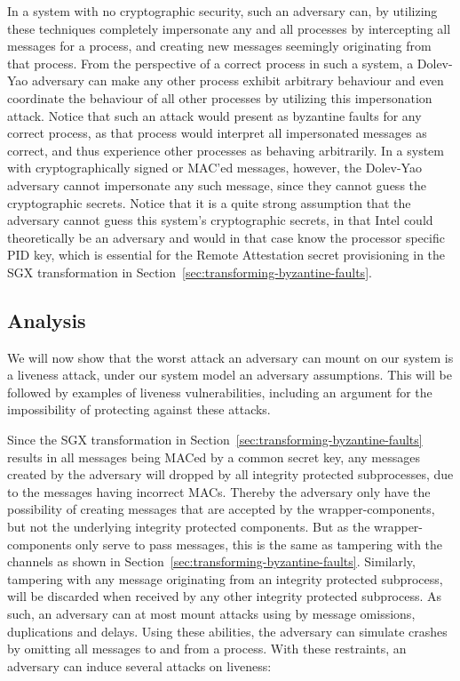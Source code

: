 \documentclass{article}
\begin{document}
		In a system with no cryptographic security, such an adversary can, by utilizing these techniques completely impersonate any and all processes by intercepting all messages for a process, and creating new messages seemingly originating from that process.
		From the perspective of a correct process in such a system, a Dolev-Yao adversary can make any other process exhibit arbitrary behaviour and even coordinate the behaviour of all other processes by utilizing this impersonation attack.
		Notice that such an attack would present as byzantine faults for any correct process, as that process would interpret all impersonated messages as correct, and thus experience other processes as behaving arbitrarily.
		In a system with cryptographically signed or MAC'ed messages, however, the Dolev-Yao adversary cannot impersonate any such message, since they cannot guess the cryptographic secrets.
		Notice that it is a quite strong assumption that the adversary cannot guess this system's cryptographic secrets, in that Intel could theoretically be an adversary and would in that case know the processor specific PID key, which is essential for the Remote Attestation secret provisioning in the SGX transformation in Section~\ref{sec:transforming-byzantine-faults}.

		\subsection{Analysis}

        We will now show that the worst attack an adversary can mount on our system is a liveness attack, under our system model an adversary assumptions.
        This will be followed by examples of liveness vulnerabilities, including an argument for the impossibility of protecting against these attacks.

		Since the SGX transformation in Section~\ref{sec:transforming-byzantine-faults} results in all messages being MACed by a common secret key, any messages created by the adversary will dropped by all integrity protected subprocesses, due to the messages having incorrect MACs.
        Thereby the adversary only have the possibility of creating messages that are accepted by the wrapper-components, but not the underlying integrity protected components.
        But as the wrapper-components only serve to pass messages, this is the same as tampering with the channels as shown in Section~\ref{sec:transforming-byzantine-faults}.
        Similarly, tampering with any message originating from an integrity protected subprocess, will be discarded when received by any other integrity protected subprocess.
        As such, an adversary can at most mount attacks using by message omissions, duplications and  delays.
        Using these abilities, the adversary can simulate crashes by omitting all messages to and from a process.
        With these restraints, an adversary can induce several attacks on liveness:
\end{document}
